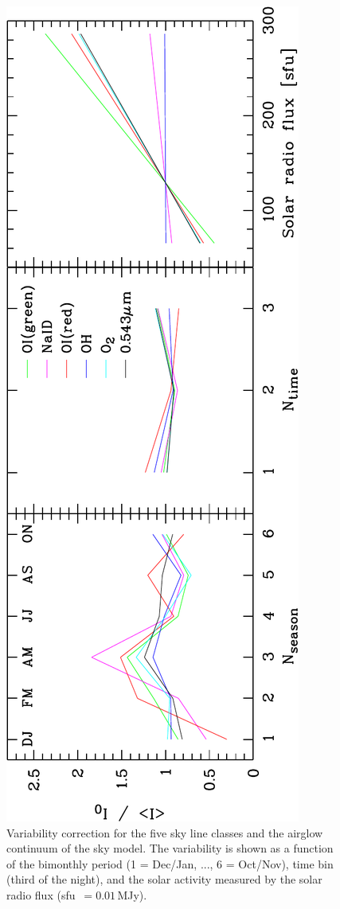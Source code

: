 \begin{figure}
\centering
\includegraphics[height=\textwidth,angle=-90,clip=true]
{figures/scd_illfeatvar.pdf}
\caption[]{Variability correction for the five sky line classes and the
airglow continuum of the sky model. The variability is shown as a function of
the bimonthly period (1 = Dec/Jan, ..., 6 = Oct/Nov), time bin (third of the
night), and the solar activity measured by the solar radio flux
(sfu~$= 0.01$\,MJy).}
\label{fig:illfeatvar}
\end{figure}

